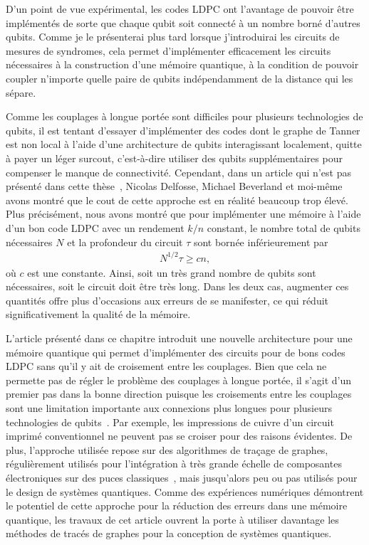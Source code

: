 D'un point de vue expérimental,
les codes LDPC ont l'avantage de pouvoir être implémentés de sorte que 
chaque qubit soit connecté à un nombre borné d'autres qubits.
Comme je le présenterai plus tard lorsque j'introduirai les circuits
de mesures de syndromes,
cela permet d'implémenter efficacement les circuits nécessaires à la
construction d'une mémoire quantique,
à la condition de pouvoir coupler n'importe quelle paire de qubits 
indépendamment de la distance qui les sépare.

Comme les couplages à longue portée sont difficiles pour plusieurs technologies de qubits,
il est tentant d'essayer d'implémenter des codes dont le graphe de Tanner est non local
à l'aide d'une architecture de qubits interagissant localement,
quitte à payer un léger surcout, c'est-à-dire utiliser des qubits supplémentaires
pour compenser le manque de connectivité.
Cependant,
dans un article qui n'est pas présenté dans cette thèse~\cite{delfosse_bounds_2021},
Nicolas Delfosse, Michael Beverland et moi-même avons montré que le cout de cette approche
est en réalité beaucoup trop élevé.
Plus précisément,
nous avons montré que pour implémenter une mémoire à l'aide d'un bon code LDPC
avec un rendement $k/n$ constant,
le nombre total de qubits nécessaires $N$ et la profondeur du circuit $\tau$ sont 
bornée inférieurement par 
\begin{align}
	N^{1/2} \tau \geq c n,
\end{align}
où $c$ est une constante.
Ainsi,
soit un très grand nombre de qubits sont nécessaires,
soit le circuit doit être très long.
Dans les deux cas,
augmenter ces quantités offre plus d'occasions aux erreurs de se manifester,
ce qui réduit significativement la qualité de la mémoire.

L'article présenté dans ce chapitre introduit une nouvelle architecture pour une mémoire quantique
qui permet d'implémenter des circuits pour de bons codes LDPC sans qu'il y ait de
croisement entre les couplages.
Bien que cela ne permette pas de régler le problème des couplages à longue portée,
il s'agit d'un premier pas dans la bonne direction puisque les croisements
entre les couplages sont une limitation importante aux connexions plus longues
pour plusieurs technologies de
qubits~\cite{sarovar_detecting_2020, debnath_demonstration_2016, neill_blueprint_2018, ash-saki_analysis_2020}.
Par exemple, 
les impressions de cuivre d'un circuit imprimé conventionnel ne peuvent pas se croiser
pour des raisons évidentes.
De plus,
l'approche utilisée repose sur des algorithmes de traçage de graphes,
régulièrement utilisés pour l'intégration à très grande échelle de composantes électroniques
sur des puces classiques~\cite{leighton_complexity_1983},
mais jusqu'alors peu ou pas utilisés pour le design de systèmes quantiques.
Comme des expériences numériques démontrent le potentiel de cette approche pour la réduction
des erreurs dans une mémoire quantique,
les travaux de cet article ouvrent la porte à utiliser davantage les méthodes 
de tracés de graphes pour la conception de systèmes quantiques.

